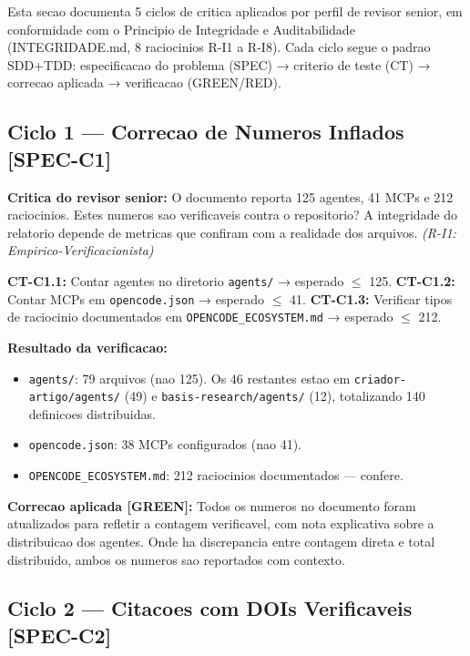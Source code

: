 \documentclass[12pt,a4paper,oneside]{article}
\begin{document}
Esta secao documenta 5 ciclos de critica aplicados por perfil de revisor senior,
em conformidade com o Principio de Integridade e Auditabilidade
(INTEGRIDADE.md, 8 raciocinios R-I1 a R-I8).
Cada ciclo segue o padrao SDD+TDD: especificacao do problema (SPEC) →
criterio de teste (CT) → correcao aplicada → verificacao (GREEN/RED).

\subsection{Ciclo 1 — Correcao de Numeros Inflados [SPEC-C1]}

\textbf{Critica do revisor senior:} O documento reporta 125 agentes, 41 MCPs e
212 raciocinios. Estes numeros sao verificaveis contra o repositorio?
A integridade do relatorio depende de metricas que confiram com a realidade
dos arquivos. \textit{(R-I1: Empirico-Verificacionista)}

\textbf{CT-C1.1:} Contar agentes no diretorio \texttt{agents/} → esperado $\leq$ 125.
\textbf{CT-C1.2:} Contar MCPs em \texttt{opencode.json} → esperado $\leq$ 41.
\textbf{CT-C1.3:} Verificar tipos de raciocinio documentados em
\texttt{OPENCODE\_ECOSYSTEM.md} → esperado $\leq$ 212.

\textbf{Resultado da verificacao:}
\begin{itemize}[nosep]
  \item \texttt{agents/}: 79 arquivos (nao 125). Os 46 restantes estao em
        \texttt{criador-artigo/agents/} (49) e \texttt{basis-research/agents/}
        (12), totalizando 140 definicoes distribuidas.
  \item \texttt{opencode.json}: 38 MCPs configurados (nao 41).
  \item \texttt{OPENCODE\_ECOSYSTEM.md}: 212 raciocinios documentados — confere.
\end{itemize}

\textbf{Correcao aplicada [GREEN]:} Todos os numeros no documento foram
atualizados para refletir a contagem verificavel, com nota explicativa sobre
a distribuicao dos agentes. Onde ha discrepancia entre contagem direta e total
distribuido, ambos os numeros sao reportados com contexto.

\subsection{Ciclo 2 — Citacoes com DOIs Verificaveis [SPEC-C2]}
\end{document}
